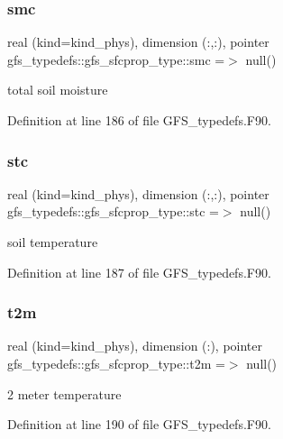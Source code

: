 \subsubsection{smc}
{\footnotesize\ttfamily real (kind=kind\+\_\+phys), dimension    (\+:,\+:), pointer gfs\+\_\+typedefs\+::gfs\+\_\+sfcprop\+\_\+type\+::smc =$>$ null()}



total soil moisture 



Definition at line 186 of file G\+F\+S\+\_\+typedefs.\+F90.

\mbox{\label{structgfs__typedefs_1_1gfs__sfcprop__type_a2fe1ebfd2495beb192a3bf7cdcefa86c}} 
\subsubsection{stc}
{\footnotesize\ttfamily real (kind=kind\+\_\+phys), dimension    (\+:,\+:), pointer gfs\+\_\+typedefs\+::gfs\+\_\+sfcprop\+\_\+type\+::stc =$>$ null()}



soil temperature 



Definition at line 187 of file G\+F\+S\+\_\+typedefs.\+F90.

\mbox{\label{structgfs__typedefs_1_1gfs__sfcprop__type_a80c653b1d0b40f1935fa1e773b6fa3a6}} 
\subsubsection{t2m}
{\footnotesize\ttfamily real (kind=kind\+\_\+phys), dimension    (\+:), pointer gfs\+\_\+typedefs\+::gfs\+\_\+sfcprop\+\_\+type\+::t2m =$>$ null()}



2 meter temperature 



Definition at line 190 of file G\+F\+S\+\_\+typedefs.\+F90.

\mbox{\label{structgfs__typedefs_1_1gfs__sfcprop__type_ae9124878cddbd0435163f40047736c70}} 
